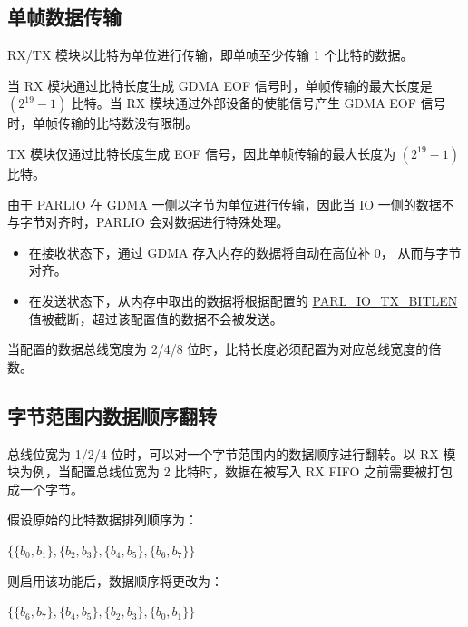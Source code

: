 \documentclass[main\_\_CN.tex]{subfiles}
\begin{document}
\subsection{单帧数据传输}

RX/TX 模块以比特为单位进行传输，即单帧至少传输 1 个比特的数据。

当 RX 模块通过比特长度生成 GDMA EOF 信号时，单帧传输的最大长度是 \begin{math} (2^{19}-1) \end{math} 比特。当 RX 模块通过外部设备的使能信号产生 GDMA EOF 信号时，单帧传输的比特数没有限制。

TX 模块仅通过比特长度生成 EOF 信号，因此单帧传输的最大长度为 \begin{math} (2^{19}-1) \end{math} 比特。

由于 PARLIO 在 GDMA 一侧以字节为单位进行传输，因此当 IO 一侧的数据不与字节对齐时，PARLIO 会对数据进行特殊处理。

\begin{itemize}
    \item 在接收状态下，通过 GDMA 存入内存的数据将自动在高位补 0， 从而与字节对齐。
    \item 在发送状态下，从内存中取出的数据将根据配置的 \hyperref[fielddesc:PARLIOTXBITLEN]{PARL\_IO\_TX\_BITLEN} 值被截断，超过该配置值的数据不会被发送。
\end{itemize}

当配置的数据总线宽度为 2/4/8 位时，比特长度必须配置为对应总线宽度的倍数。


\subsection{字节范围内数据顺序翻转}

总线位宽为 1/2/4 位时，可以对一个字节范围内的数据顺序进行翻转。以 RX 模块为例，当配置总线位宽为 2 比特时，数据在被写入 RX FIFO 之前需要被打包成一个字节。

假设原始的比特数据排列顺序为：

\begin{center}
$\{ \{ b_{0}, b_{1} \}, \{ b_{2}, b_{3} \}, \{ b_{4}, b_{5} \}, \{ b_{6}, b_{7} \} \}$
\end{center}

则启用该功能后，数据顺序将更改为：

\begin{center}
$\{ \{ b_{6}, b_{7} \}, \{ b_{4}, b_{5} \}, \{ b_{2}, b_{3} \}, \{ b_{0}, b_{1} \} \}$
\end{center}
\end{document}
